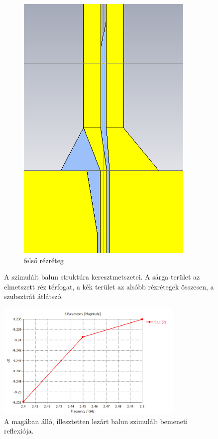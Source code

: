 \begin{figure}[h]
\begin{subfigure}[b]{0.3\textwidth}
		\includegraphics[width=\textwidth]{kep/results/balun_3.png}
		\caption{felső rézréteg}
	\end{subfigure}
	\caption{A szimulált balun struktúra keresztmetszetei. A sárga terület az elmetszett réz térfogat, a kék terület az alsóbb rézrétegek összesen, a szubsztrát átlátszó.}
	\label{fig:balun-kereszt}
\end{figure}
\begin{figure}[h]
	\centering
	\includegraphics[width=0.8\textwidth]{kep/results/balun_S11.png}
	\caption{A magában álló, illesztetten lezárt balun szimulált bemeneti reflexiója.}
	\label{fig:balun-s11}
\end{figure}
